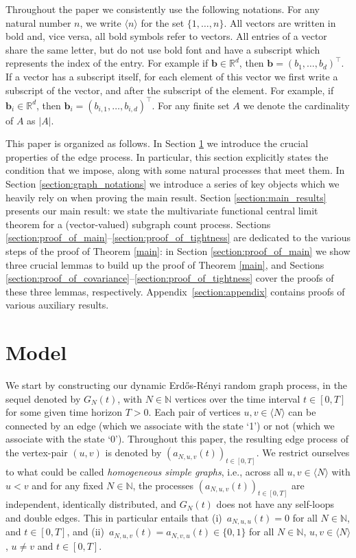 \documentclass[11pt,reqno]{amsart}
\numberwithin{equation}{section}
\newcommand{\abs}[1]{\left\lvert #1 \right\rvert}
\newcommand{\sprod}[1]{\langle#1\rangle}
\newcommand{\R}{\mathbb{R}}
\newcommand{\N}{\mathbb{N}}
\newcommand{\netheo}[1]{{Theorem \ref{#1}}}
\newcommand{\kb}[1]{\boldsymbol{#1}}
\newcommand{\vk}[1]{\kb{#1}}
\begin{document}
 Throughout the paper we consistently use the following notations. For any {natural number} $n$, we write $\sprod{n}$ for the set $\{1,\ldots,n\}$. All vectors are written in bold and, vice versa, all bold symbols refer to vectors. All entries of a vector share the same letter, but do not use bold font and have a subscript which represents the index of the entry. For example if $\vk b\in\R^d$, then $\vk b = (b_1,\ldots,b_d)^{\top}$. If a vector has a subscript itself, for each element of this vector we first write a subscript of the vector, and after the subscript of the element. For example, if $\vk b_i\in\R^d$, then $\vk b_i = (b_{i,1},\ldots,b_{i,d})^{\top}$. For any finite set $A$ we denote the cardinality of $A$ as $\abs{A}$.

\medskip

 This paper is organized as follows. In Section \ref{section:model} we introduce the crucial properties of the edge process. 
In particular, this section explicitly states the condition that we impose,  along with some natural processes that meet them.
{In Section \ref{section:graph_notations} we introduce a series of key objects which we heavily rely on when proving the main result. Section \ref{section:main_results} presents our main result: we state the multivariate functional central limit theorem for a (vector-valued) subgraph count process.} Sections \ref{section:proof_of_main}--\ref{section:proof_of_tightness} are dedicated to the various steps of the proof of \netheo{main}: in  Section \ref{section:proof_of_main} we show three crucial lemmas to build up the proof of \netheo{main}, and Sections \ref{section:proof_of_covariance}--\ref{section:proof_of_tightness} cover the proofs of these three lemmas, respectively.  Appendix~\ref{section:appendix} contains proofs of various auxiliary results.


 
\section{Model}\label{section:model} 
We start by constructing our dynamic Erd\H{o}s-R\'{e}nyi random graph process, in the sequel denoted by $G_N(t)$, with $N\in\N$ vertices over the time interval $t\in[0,T]$ for some given time horizon $T>0$. Each pair of vertices $u,v\in\sprod{N}$ can be connected by an edge (which we associate with the state `1') or not (which we associate with the state `0'). Throughout this paper, the resulting edge process of the vertex-pair $(u,v)$ is denoted by $(a_{N,u,v}(t))_{t\in[0,T]}$. We restrict ourselves to what could be called {\it homogeneous simple graphs}, i.e., across all $u,v\in\sprod{N}$ with $u<v$ and for any fixed $N\in\N$, the processes $(a_{N,u,v}(t))_{t\in[0,T]}$ are independent, identically distributed, and $G_N(t)$ does not have any self-loops and double edges. This in particular entails that (i)~$a_{N,u,u}(t) = 0$ for all $N\in\N$, and $t\in[0,T]$, and (ii)~$a_{N,u,v}(t)= a_{N,v,u}(t)\in\{0,1\}$ for all $N\in\N$, $u,v\in\sprod{N}$, $u\not= v$ and $t\in[0,T]$.
\end{document}
